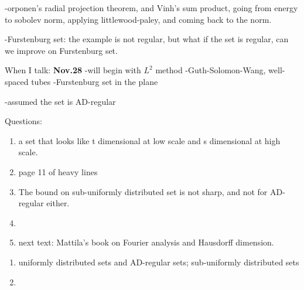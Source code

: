 -orponen's radial projection theorem, and Vinh's sum product, going from energy to sobolev norm, applying littlewood-paley, and coming back to the norm.

-Furstenburg set: the example is not regular, but what if the set is regular, can we improve on Furstenburg set.


When I talk:
\textbf{Nov.28}
-will begin with $L^2$ method
-Guth-Solomon-Wang, well-spaced tubes
-Furstenburg set in the plane



-assumed the set is AD-regular



Questions:
\begin{enumerate}
    \item a set that looks like t dimensional at low scale and s dimensional at high scale.
    \item page 11 of heavy lines
    \item The bound on sub-uniformly distributed set is not sharp, and not for AD-regular either.
    \item 
    \item next text: Mattila's book on Fourier analysis and Hausdorff dimension.


\end{enumerate}


\begin{enumerate}
    \item uniformly distributed sets and AD-regular sets; sub-uniformly distributed sets
    \item 
\end{enumerate}

